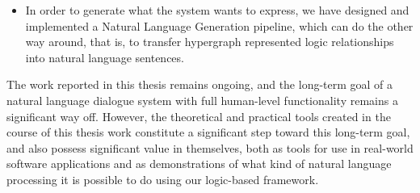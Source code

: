 \begin{englishabstract}
\begin{itemize}
\item In order to generate what the system wants to express, we have designed and implemented a Natural Language Generation pipeline, which can do the other way around, that is, to transfer hypergraph represented logic relationships into natural language sentences.

\end{itemize}

The work reported in this thesis remains ongoing, and the long-term goal of a natural language dialogue system with full human-level functionality remains a significant way off.   However, the theoretical and practical tools created in the course of this thesis work constitute a significant step toward this long-term goal, and also possess significant value in themselves, both as tools for use in real-world software applications and as demonstrations of what kind of natural language processing it is possible to do using our logic-based framework.

\end{englishabstract}
